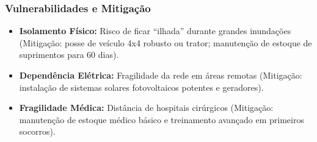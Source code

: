 \subsubsection{Vulnerabilidades e
Mitigação}

\begin{itemize}
\tightlist
\item
  \textbf{Isolamento Físico:} Risco de ficar ``ilhada'' durante grandes
  inundações (Mitigação: posse de veículo 4x4 robusto ou trator;
  manutenção de estoque de suprimentos para 60 dias).
\item
  \textbf{Dependência Elétrica:} Fragilidade da rede em áreas remotas
  (Mitigação: instalação de sistemas solares fotovoltaicos potentes e
  geradores).
\item
  \textbf{Fragilidade Médica:} Distância de hospitais cirúrgicos
  (Mitigação: manutenção de estoque médico básico e treinamento avançado
  em primeiros socorros).
\end{itemize}

